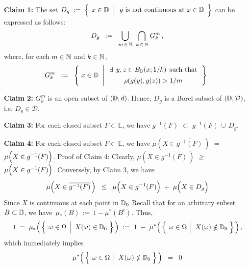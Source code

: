 \vskip 0.3cm
\noindent
\textbf{Claim 1:}\;\;
The set\;
$D_{g}
\; := \;
	\left\{\;\left.
		x\overset{{\color{white}.}}{\in}\D
		\;\;\right\vert
		\begin{array}{c}\textnormal{$g$ is not continuous at $x\in\D$}\end{array}
		\right\}$
\;can be expressed as follows:
\begin{equation*}
D_{g}
\;\; := \;\;
	\underset{m\,\in\,\mathbb{N}}{\bigcup}\;\;
	\underset{k\,\in\,\mathbb{N}}{\bigcap}\;
	G^{m}_{k}\,,
\end{equation*}
where, for each $m\in\mathbb{N}$ and $k\in\mathbb{N}$,
\begin{equation*}
G^{m}_{k}
\;\; := \;\;
	\left\{\;
		x\overset{{\color{white}.}}{\in}\D
		\;\,\left\vert\,
		\begin{array}{c} \exists \;\,y,z \in B_{\D}(x;1/k) \;\,\textnormal{such that} \\ \rho(g(y),g(z)) \overset{{\color{white}-}}{>} 1/m \end{array}
		\right.
		\right\}.
\end{equation*}

\vskip 0.5cm
\noindent
\textbf{Claim 2:}\;\;
$G^{m}_{k}$ is an open subset of $(\mathbb{D},d)$. Hence, $D_{g}$ is a Borel subset of $(\mathbb{D},\mathcal{D})$, i.e. $D_{g} \in \mathcal{D}$.

\vskip 0.5cm
\noindent
\textbf{Claim 3:}\;\;
For each closed subset $F \subset \mathbb{E}$, we have\;
$\overline{g^{-1}(F)}$ \;$\subset$\; $g^{-1}(F)\,\cup\,D_{g}$.

\vskip 0.5cm
\noindent
\textbf{Claim 4:}\;\;
For each closed subset $F \subset \mathbb{E}$, we have\;
$\mu\!\left(X\in\overline{g^{-1}(F)}\,\right)$ \;$=$\;
$\mu\!\left(X\overset{{\color{white}.}}{\in} g^{-1}(F)\right)$.
\vskip 0.1cm
\noindent
Proof of Claim 4:\quad
Clearly, 
$\mu\!\left(X\in\overline{g^{-1}(F)}\,\right)$ \;$\geq$\;
$\mu\!\left(X\overset{{\color{white}.}}{\in} g^{-1}(F)\right)$.
Conversely, by Claim 3, we have
\begin{equation*}
\mu\!\left(X\in\overline{g^{-1}(F)}\,\right)
\;\;\leq\;\;
	\mu\!\left(X\overset{{\color{white}.}}{\in} g^{-1}(F)\right)
	\; + \;
	\mu\!\left(X\overset{{\color{white}.}}{\in} D_{g}\right)
\end{equation*}
Since $X$ is continuous at each point in $\mathbb{D}_{0}$
Recall that for an arbitrary subset $B \subset \mathbb{D}$, we have \,$\mu_{*}(B) \,:=\, 1 - \mu^{*}(B^{c})$.
Thus,
\begin{equation*}
1
\;=\;
	\mu_{*}\!\left(\,\left\{\;\left.\omega\overset{{\color{white}.}}{\in}\Omega\;\,\right\vert\;X(\omega)\in\D_{0}\;\right\}\,\right)
\;:=\;
	1 \; - \; \mu^{*}\!\left(\,\left\{\;\left.\omega\overset{{\color{white}.}}{\in}\Omega\;\,\right\vert\;X(\omega)\notin\D_{0}\;\right\}\,\right),
\end{equation*}
which immediately implies
\begin{equation*}
\mu^{*}\!\left(\,\left\{\;\left.\omega\overset{{\color{white}.}}{\in}\Omega\;\,\right\vert\;X(\omega)\notin\D_{0}\;\right\}\,\right) \;\;=\;\; 0
\end{equation*}

